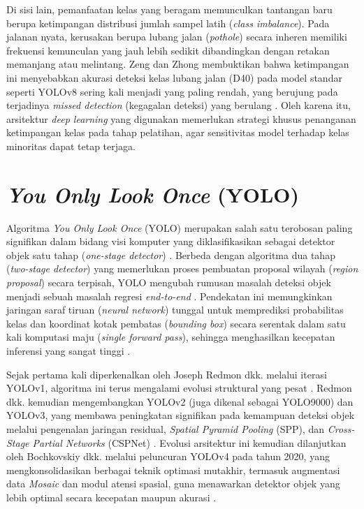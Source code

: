 Di sisi lain, pemanfaatan kelas yang beragam memunculkan tantangan baru berupa ketimpangan distribusi jumlah sampel latih (\textit{class imbalance}). Pada jalanan nyata, kerusakan berupa lubang jalan (\textit{pothole}) secara inheren memiliki frekuensi kemunculan yang jauh lebih sedikit dibandingkan dengan retakan memanjang atau melintang. Zeng dan Zhong membuktikan bahwa ketimpangan ini menyebabkan akurasi deteksi kelas lubang jalan (D40) pada model standar seperti YOLOv8 sering kali menjadi yang paling rendah, yang berujung pada terjadinya \textit{missed detection} (kegagalan deteksi) yang berulang \cite{Zeng2024}.  Oleh karena itu, arsitektur \textit{deep learning} yang digunakan memerlukan strategi khusus penanganan ketimpangan kelas pada tahap pelatihan, agar sensitivitas model terhadap kelas minoritas dapat tetap terjaga.

\section{\textit{You Only Look Once} (YOLO)}
Algoritma \textit{You Only Look Once} (YOLO) merupakan salah satu terobosan paling signifikan dalam bidang visi komputer yang diklasifikasikan sebagai detektor objek satu tahap (\textit{one-stage detector}) \cite{redmon2016you}. Berbeda dengan algoritma dua tahap (\textit{two-stage detector}) yang memerlukan proses pembuatan proposal wilayah (\textit{region proposal}) secara terpisah, YOLO mengubah rumusan masalah deteksi objek menjadi sebuah masalah regresi \textit{end-to-end} \cite{redmon2016you, Li2024}. Pendekatan ini memungkinkan jaringan saraf tiruan (\textit{neural network}) tunggal untuk memprediksi probabilitas kelas dan koordinat kotak pembatas (\textit{bounding box}) secara serentak dalam satu kali komputasi maju (\textit{single forward pass}), sehingga menghasilkan kecepatan inferensi yang sangat tinggi \cite{redmon2016you}.

Sejak pertama kali diperkenalkan oleh Joseph Redmon dkk. melalui iterasi YOLOv1, algoritma ini terus mengalami evolusi struktural yang pesat \cite{redmon2016you}. Redmon dkk. kemudian mengembangkan YOLOv2 (juga dikenal sebagai YOLO9000) dan YOLOv3, yang membawa peningkatan signifikan pada kemampuan deteksi objek melalui pengenalan jaringan residual, \textit{Spatial Pyramid Pooling} (SPP), dan \textit{Cross-Stage Partial Networks} (CSPNet) \cite{redmon2017yolo9000, redmon2018yolov3}. Evolusi arsitektur ini kemudian dilanjutkan oleh Bochkovskiy dkk. melalui peluncuran YOLOv4 pada tahun 2020, yang mengkonsolidasikan berbagai teknik optimasi mutakhir, termasuk augmentasi data \textit{Mosaic} dan modul atensi spasial, guna menawarkan detektor objek yang lebih optimal secara kecepatan maupun akurasi \cite{bochkovskiy2020yolov4}.

